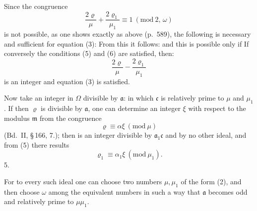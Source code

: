 Since the congruence
\[
\frac{2\varrho}{\mu} + \frac{2\varrho_1}{\mu_1} \equiv 1\ (\mathrm{mod}\ 2,\,\omega)
\]
is not possible, as one shows exactly as above (p.\ 589), the following is
necessary and sufficient for equation (3):
From this it follows:
and this is possible only if
If conversely the conditions (5) and (6) are satisfied, then:
\[
\frac{2\varrho}{\mu} - \frac{2\varrho_1}{\mu_1}
\]
is an integer and equation (3) is satisfied.

Now take an integer in $\Omega$ divisible by $\mathfrak{a}$:
in which $\mathfrak{c}$ is relatively prime to $\mu$ and $\mu_1$. If then $\varrho$ is
divisible by $\mathfrak{a}$, one can determine an integer $\xi$ with respect to the
modulus $\mathfrak{m}$ from the congruence
\[
\varrho \equiv \alpha\xi\ (\mathrm{mod}\ \mu)
\]
(Bd.\ II, \S\,166, 7.); then
is an integer divisible by $\mathfrak{a}_1\mathfrak{c}$ and by no other ideal,
and from (5) there results
\[
\varrho_1 \equiv \alpha_1\xi\ (\mathrm{mod}\ \mu_1).
\]
5. 


For to every such ideal one can choose two numbers $\mu, \mu_1$
of the form (2), and then choose $\omega$ among the equivalent
numbers in such a way that $\mathfrak{a}$ becomes odd and relatively prime to $\mu\mu_1$.
